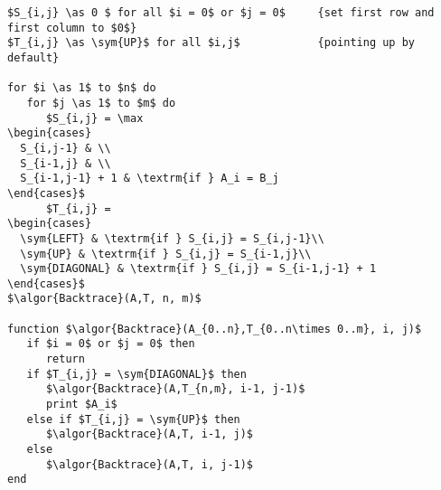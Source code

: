 
\begin{algorithm}
  \caption{($A_{0..n},B_{0..m}$)}
  \label{algo:LCS}
\begin{lstlisting}[language=Algorithm]
$S_{i,j} \as 0 $ for all $i = 0$ or $j = 0$		{set first row and first column to $0$}
$T_{i,j} \as \sym{UP}$ for all $i,j$			{pointing up by default}

for $i \as 1$ to $n$ do
   for $j \as 1$ to $m$ do
      $S_{i,j} = \max 
\begin{cases}
  S_{i,j-1} & \\
  S_{i-1,j} & \\
  S_{i-1,j-1} + 1 & \textrm{if } A_i = B_j
\end{cases}$
      $T_{i,j} = 
\begin{cases}
  \sym{LEFT} & \textrm{if } S_{i,j} = S_{i,j-1}\\
  \sym{UP} & \textrm{if } S_{i,j} = S_{i-1,j}\\
  \sym{DIAGONAL} & \textrm{if } S_{i,j} = S_{i-1,j-1} + 1
\end{cases}$
$\algor{Backtrace}(A,T, n, m)$

function $\algor{Backtrace}(A_{0..n},T_{0..n\times 0..m}, i, j)$
   if $i = 0$ or $j = 0$ then
      return
   if $T_{i,j} = \sym{DIAGONAL}$ then
      $\algor{Backtrace}(A,T_{n,m}, i-1, j-1)$
      print $A_i$
   else if $T_{i,j} = \sym{UP}$ then
      $\algor{Backtrace}(A,T, i-1, j)$
   else 
      $\algor{Backtrace}(A,T, i, j-1)$
end
\end{lstlisting}
\end{algorithm}

